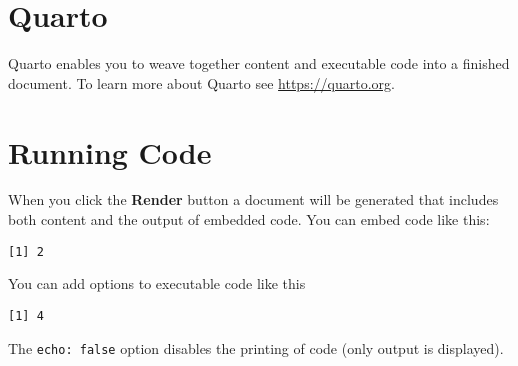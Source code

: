 \documentclass[
  number]{elsarticle}
\begin{document}
    \ifdefined\Shaded\renewenvironment{Shaded}{\begin{tcolorbox}[sharp corners, frame hidden, enhanced, boxrule=0pt, breakable, borderline west={3pt}{0pt}{shadecolor}, interior hidden]}{\end{tcolorbox}}\fi

\hypertarget{quarto}{%
\section{Quarto}\label{quarto}}

Quarto enables you to weave together content and executable code into a
finished document. To learn more about Quarto see
\url{https://quarto.org}.

\hypertarget{running-code}{%
\section{Running Code}\label{running-code}}

When you click the \textbf{Render} button a document will be generated
that includes both content and the output of embedded code. You can
embed code like this:

\begin{verbatim}
[1] 2
\end{verbatim}

You can add options to executable code like this

\begin{verbatim}
[1] 4
\end{verbatim}

The \texttt{echo:\ false} option disables the printing of code (only
output is displayed).


  
\end{document}
